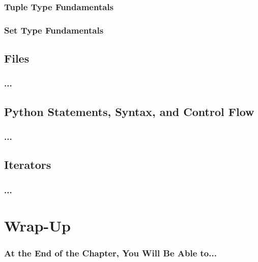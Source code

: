\documentclass[aspectratio=1610]{beamer}
\begin{document}
\begin{frame}
    \frametitle{Tuple Type Fundamentals}
\end{frame}

\begin{frame}
    \frametitle{Set Type Fundamentals}
\end{frame}

\subsection{Files}

\begin{frame}
    \frametitle{...}
\end{frame}

\subsection{Python Statements, Syntax, and Control Flow}

\begin{frame}
    \frametitle{...}
\end{frame}

\subsection{Iterators }

\begin{frame}
    \frametitle{...}
\end{frame}

\section{Wrap-Up}

\begin{frame}
    \frametitle{At the End of the Chapter, You Will Be Able to...}
\end{frame}
\end{document}
